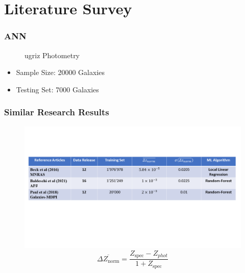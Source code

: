 \documentclass{beamer}
\begin{document}
\section{Literature Survey}
\begin{frame}
        \frametitle{ANN}
        \begin{figure}
            \caption*{ugriz Photometry}
        \end{figure}
        \begin{itemize}
            \item Sample Size: 20000 Galaxies
            \item Testing Set: 7000 Galaxies
        \end{itemize}
        \end{frame}

\begin{frame}
        \frametitle{Similar Research Results}
        \begin{figure}
\vspace*{-18mm}
            \includegraphics[scale=0.37]{img/Litsurvey.png}
\vspace*{-25mm}
\begin{equation}
    \overline{\Delta Z_{\text {norm}}}=\frac{Z_{\text {spec}}-Z_{phot}}{1+Z_{\text {spec}}}
\end{equation}
        \end{figure}

        \end{frame}
\end{document}
